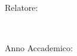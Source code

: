 \begin{titlepage}
\begin{center}
        \bigskip
        
        \normalsize Relatore: \\
        \Large {}

        \vfill ~ \vfill ~ \vfill
        
        \normalsize Anno Accademico: \\
        \Large {}


                   

    \end{center}        

\end{titlepage} 